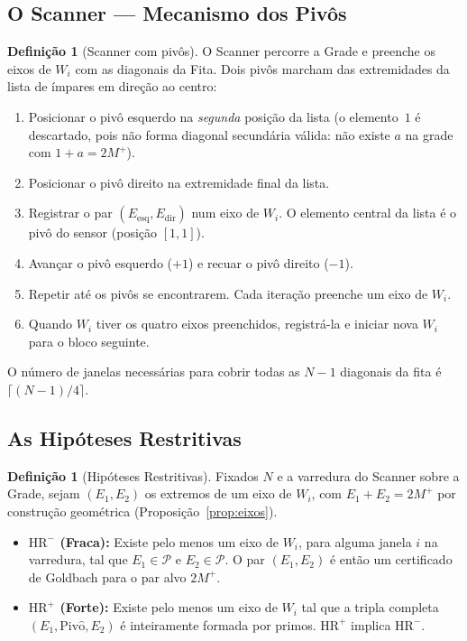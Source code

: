 \documentclass[12pt,a4paper]{article}
\theoremstyle{definition}
\newtheorem{definition}[theorem]{Definição}
\newcommand{\PP}{\mathcal{P}}          %
\newcommand{\HRm}{\mathrm{HR}^{-}}
\newcommand{\HRp}{\mathrm{HR}^{+}}
\begin{document}
	\subsection{O Scanner — Mecanismo dos Pivôs}
	
	\begin{definition}[Scanner com pivôs]
		\label{def:scanner}
		O Scanner percorre a Grade e preenche os eixos de $W_i$ com as
		diagonais da Fita. Dois pivôs marcham das extremidades da lista
		de ímpares em direção ao centro:
		\begin{enumerate}
			\item Posicionar o pivô esquerdo na \emph{segunda} posição da
			lista (o elemento~$1$ é descartado, pois não forma
			diagonal secundária válida: não existe $a$ na grade com
			$1 + a = 2M^+$).
			\item Posicionar o pivô direito na extremidade final da lista.
			\item Registrar o par $(E_{\mathrm{esq}}, E_{\mathrm{dir}})$
			num eixo de $W_i$. O elemento central da lista é o
			pivô do sensor (posição $[1,1]$).
			\item Avançar o pivô esquerdo ($+1$) e recuar o pivô direito
			($-1$).
			\item Repetir até os pivôs se encontrarem. Cada iteração
			preenche um eixo de $W_i$.
			\item Quando $W_i$ tiver os quatro eixos preenchidos,
			registrá-la e iniciar nova $W_i$ para o bloco seguinte.
		\end{enumerate}
		O número de janelas necessárias para cobrir todas as $N-1$
		diagonais da fita é $\lceil (N-1)/4 \rceil$.
	\end{definition}
	
	\subsection{As Hipóteses Restritivas}
	
	\begin{definition}[Hipóteses Restritivas]
		\label{def:HR}
		Fixados $N$ e a varredura do Scanner sobre a Grade, sejam
		$(E_1, E_2)$ os extremos de um eixo de $W_i$, com
		$E_1 + E_2 = 2M^+$ por construção geométrica
		(Proposição~\ref{prop:eixos}).
		
		\begin{itemize}
			\item \textbf{$\HRm$ (Fraca):} Existe pelo menos um eixo de
			$W_i$, para alguma janela $i$ na varredura, tal que
			$E_1 \in \PP$ e $E_2 \in \PP$. O par $(E_1, E_2)$ é então
			um certificado de Goldbach para o par alvo $2M^+$.
			\item \textbf{$\HRp$ (Forte):} Existe pelo menos um eixo de
			$W_i$ tal que a tripla completa
			$(E_1, \mathrm{Piv\hat{o}}, E_2)$ é inteiramente formada
			por primos. $\HRp$ implica $\HRm$.
		\end{itemize}
	\end{definition}
	
\end{document}
